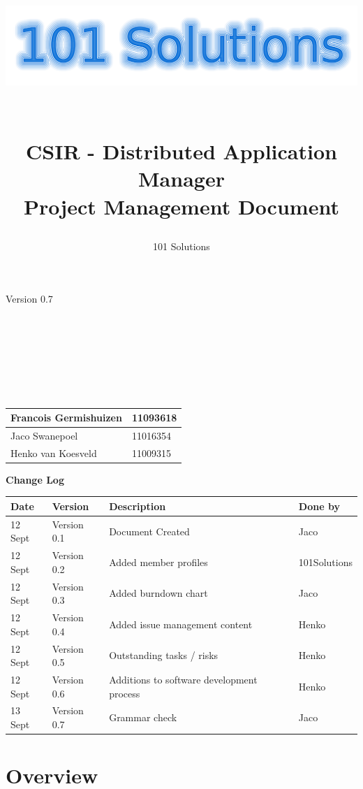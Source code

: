 \documentclass[a4paper,12pt,final]{article}
\title{
\begin{center}
  	\includegraphics[scale=0.3]{101Logo.png} 
  \end{center}
  \textbf{\\}
CSIR - Distributed Application Manager\\
Project Management Document\\
}
\author{101 Solutions}
\begin{document}
\maketitle
\begin{center}
Version 0.7
\end{center}
\textbf{\\}
\textbf{\\}
\textbf{\\}
\textbf{\\}
\textbf{\\}
\textbf{\\}
\begin{center}
\begin{tabular}{|l|l|}
\hline
Francois Germishuizen & 11093618\\
\hline
Jaco Swanepoel & 11016354\\
\hline
Henko van Koesveld & 11009315\\
\hline
\end{tabular}
\end{center}
\thispagestyle{empty}
\newpage
\thispagestyle{empty}
\textbf{\large{Change Log}}
\vspace{6pt}\newline
\begin{tabular}{|l|l|l|l|}
\hline
\textbf{Date} & \textbf{Version} & \textbf{Description} & \textbf{Done by}\\
\hline
12 Sept & Version 0.1 & Document Created & Jaco\\
\hline
12 Sept & Version 0.2 & Added member profiles & 101Solutions\\
\hline
12 Sept & Version 0.3 & Added burndown chart & Jaco\\
\hline
12 Sept & Version 0.4 & Added issue management content & Henko\\
\hline
12 Sept & Version 0.5 & Outstanding tasks / risks & Henko\\
\hline
12 Sept & Version 0.6 & Additions to  software development process & Henko\\
\hline
13 Sept & Version 0.7 & Grammar check & Jaco\\
\hline
\end{tabular}
\newpage
\tableofcontents
\thispagestyle{empty}
\newpage

\section{Overview}
\end{document}
